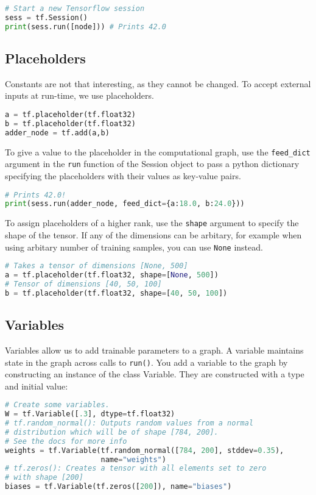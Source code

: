 \documentclass[Proceedings]{ascelike}
\begin{document}
\begin{lstlisting}[language=Python]
# Start a new Tensorflow session
sess = tf.Session()
print(sess.run([node])) # Prints 42.0
\end{lstlisting}

\subsection{Placeholders}
Constants are not that interesting, as they cannot be changed. To accept external inputs at run-time, we use placeholders.

\begin{lstlisting}[language=Python]
a = tf.placeholder(tf.float32)
b = tf.placeholder(tf.float32)
adder_node = tf.add(a,b)
\end{lstlisting}

To give a value to the placeholder in the computational graph, use the \texttt{feed\_dict} argument in the \texttt{run} function of the Session object to pass a python dictionary specifying the placeholders with their values as key-value pairs.

\begin{lstlisting}[language=Python]
# Prints 42.0!
print(sess.run(adder_node, feed_dict={a:18.0, b:24.0}))
\end{lstlisting}

To assign placeholders of a higher rank, use the \texttt{shape} argument to specify the shape of the tensor. If any of the dimensions can be arbitary, for example when using arbitary number of training samples, you can use \texttt{None} instead.

\begin{lstlisting}[language=Python]
# Takes a tensor of dimensions [None, 500]
a = tf.placeholder(tf.float32, shape=[None, 500])
# Tensor of dimensions [40, 50, 100]
b = tf.placeholder(tf.float32, shape=[40, 50, 100])
\end{lstlisting}

\subsection{Variables}
Variables allow us to add trainable parameters to a graph. A variable maintains state in the graph across calls to \texttt{run()}. You add a variable to the graph by constructing an instance of the class Variable. They are constructed with a type and initial value:

\begin{lstlisting}[language=Python]
# Create some variables.
W = tf.Variable([.3], dtype=tf.float32)
# tf.random_normal(): Outputs random values from a normal 
# distribution which will be of shape [784, 200]. 
# See the docs for more info
weights = tf.Variable(tf.random_normal([784, 200], stddev=0.35),
                      name="weights")
# tf.zeros(): Creates a tensor with all elements set to zero 
# with shape [200]
biases = tf.Variable(tf.zeros([200]), name="biases")
\end{lstlisting}
\end{document}
